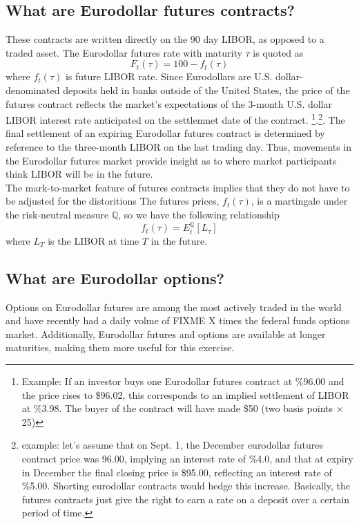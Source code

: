 \documentclass[11pt]{article}
\begin{document}
\subsection{What are Eurodollar futures contracts?}
These contracts are written directly on the 90 day LIBOR, as opposed to a traded asset. The Eurodollar futures rate with maturity $\tau$ is quoted as 
\begin{equation*}
	F_{t}(\tau) = 100 - f_{t}(\tau)
\end{equation*}
where $f_{t}(\tau)$ is future LIBOR rate. Since Eurodollars are U.S. dollar-denominated deposits held in banks outside of the United States, the price of the futures contract reflects the market's expectations of the 3-month U.S. dollar LIBOR interest rate anticipated on the settlemnet date of the contract. \footnote{Example: If an investor buys one Eurodollar futures contract at \%96.00 and the price rises to \$96.02, this corresponds to an implied settlement of LIBOR at \%3.98. The buyer of the contract will have made \$50 (two basis points $\times$ 25)}.\footnote{example: let's assume that on Sept. 1, the December eurodollar futures contract price was 96.00, implying an interest rate of \%4.0, and that at expiry in December the final closing price is \$95.00, reflecting an interest rate of \%5.00. Shorting eurodollar contracts would hedge this increase. Basically, the futures contracts just give the right to earn a rate on a deposit over a certain period of time. }. The final settlement of an expiring Eurodollar futures contract is determined by reference to the three-month LIBOR on the last trading day. Thus, movements in the Eurodollar futures market provide insight as to where market participants think LIBOR will be in the future.\\

The mark-to-market feature of futures contracts implies that they do not have to be adjusted for the distoritions
The futures prices, $f_{t}(\tau)$, is a martingale under the risk-neutral measure $\mathbb{Q}$, so we have the following relationship 
\begin{equation*}
	f_{t}(\tau) = E_{t}^{\mathbb{Q}}\left[L_{\tau}\right]
\end{equation*}
where $L_{T}$ is the LIBOR at time $T$ in the future. 
\\

\subsection{What are Eurodollar options? }
 Options on Eurodollar futures are among the most actively traded in the world and have recently had a daily volme of FIXME X times the federal funds options market. Additionally, Eurodollar futures and options are available at longer maturities, making them more useful for this exercise. \\
\end{document}
